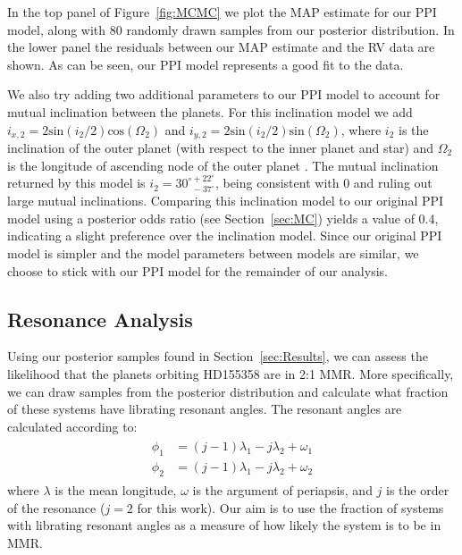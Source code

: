 In the top panel of Figure~\ref{fig:MCMC} we plot the MAP estimate for our PPI model, along with 80 randomly drawn samples from our posterior distribution.
In the lower panel the residuals between our MAP estimate and the RV data are shown. 
As can be seen, our PPI model represents a good fit to the data. 

We also try adding two additional parameters to our PPI model to account for mutual inclination between the planets.
For this inclination model we add $i_{x,2} = 2\textrm{sin}(i_2/2)\textrm{cos}(\Omega_2)$ and $i_{y,2} = 2\textrm{sin}(i_2/2)\textrm{sin}(\Omega_2)$, where $i_2$ is the inclination of the outer planet (with respect to the inner planet and star) and $\Omega_2$ is the longitude of ascending node of the outer planet \citep{Pal2009}. 
The mutual inclination returned by this model is $i_2 = 30^{\circ +22^{\circ}}_{\ \ -37^{\circ}}$, being consistent with 0 and ruling out large mutual inclinations. 
Comparing this inclination model to our original PPI model using a posterior odds ratio (see Section~\ref{sec:MC}) yields a value of 0.4, indicating a slight preference over the inclination model.
Since our original PPI model is simpler and the model parameters between models are similar, we choose to stick with our PPI model for the remainder of our analysis. 


\subsection{Resonance Analysis}
Using our posterior samples found in Section~\ref{sec:Results}, we can assess the likelihood that the planets orbiting HD155358 are in 2:1 MMR. 
More specifically, we can draw samples from the posterior distribution and calculate what fraction of these systems have librating resonant angles. 
The resonant angles are calculated according to:
\begin{align*}
\begin{split}
\phi_1 &= (j - 1)\lambda_1 - j\lambda_2 + \omega_1 \\
\phi_2 &= (j - 1)\lambda_1 - j\lambda_2 + \omega_2 
\end{split}
\end{align*}
where $\lambda$ is the mean longitude, $\omega$ is the argument of periapsis, and $j$ is the order of the resonance ($j=2$ for this work).
Our aim is to use the fraction of systems with librating resonant angles as a measure of how likely the system is to be in MMR. 


